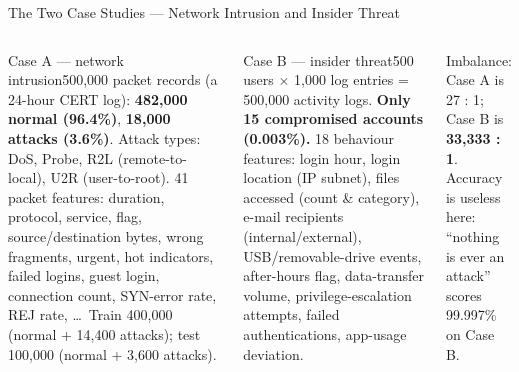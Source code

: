 \documentclass[aspectratio=169,10pt,t]{beamer}
\begin{document}
\begin{frame}{The Two Case Studies --- Network Intrusion and Insider Threat}
\begin{columns}[T]
\begin{cbox}[ISSAred]{Case A --- network intrusion}\scriptsize 500,000 packet records (a 24-hour CERT log): \textbf{482,000 normal (96.4\%)}, \textbf{18,000 attacks (3.6\%)}. Attack types: DoS, Probe, R2L (remote-to-local), U2R (user-to-root). 41 packet features: duration, protocol, service, flag, source/destination bytes, wrong fragments, urgent, hot indicators, failed logins, guest login, connection count, SYN-error rate, REJ rate, \ldots\ Train 400,000 (normal + 14,400 attacks); test 100,000 (normal + 3,600 attacks).\end{cbox}
\begin{cbox}[AccentCol]{Case B --- insider threat}\scriptsize 500 users $\times$ 1,000 log entries = 500,000 activity logs. \textbf{Only 15 compromised accounts (0.003\%).} 18 behaviour features: login hour, login location (IP subnet), files accessed (count \& category), e-mail recipients (internal/external), USB/removable-drive events, after-hours flag, data-transfer volume, privilege-escalation attempts, failed authentications, app-usage deviation.\end{cbox}
\begin{wbox}\scriptsize Imbalance: Case A is 27 : 1; Case B is \textbf{33,333 : 1}. Accuracy is useless here: ``nothing is ever an attack'' scores 99.997\% on Case B.\end{wbox}
\end{columns}
\end{frame}
\end{document}
